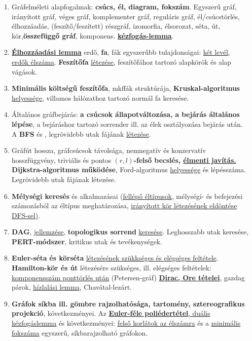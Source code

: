 \documentclass[10pt]{article}
\begin{document}
        \begin{enumerate}
            \item Gráfelméleti alapfogalmak: \textbf{csúcs, él, diagram, fokszám}. Egyszerű gráf, irányított gráf, véges gráf, komplementer gráf, reguláris gráf, él/csúcstörlés, élhozzáadás, (feszítő/feszített) részgráf, izomorfia, élsorozat, séta, út, kör,\textbf{összefüggő gráf}, komponens. \underline{\textbf{kézfogás-lemma}}.
            \item \underline{\textbf{Élhozzáadási lemma}} erdő, \textbf{fa}, fák egyszerűbb tulajdonságai: \underline{két levél}, \underline{erdők élszáma}. \textbf{Feszítőfa} \underline{létezése}, feszítőfához tartozó alapkörök és alap vágások.
            \item \textbf{Minimális költségű feszítőfa}, mkffák struktúrája, \textbf{Kruskal-algoritmus} \underline{helyessége}, villamos hálózathoz tartozó normál fa keresése.
            \item Általános gráfbejárás: \textbf{a csúcsok állapotváltozása, a bejárás általános lépése}, a bejáráshoz tartozó sorrender ill. az élek osztályozása bejárás után. A \textbf{BFS} és , legrövidebb utak fájának \underline{létezése}.
            \item Gráfút hossza, gráfcsúcsok távolsága, nemnegatív és konzervatív hosszfüggvény, triviális és pontos $(r,l)$\textbf{-felső becslés, \underline{élmenti javítás.} Dijkstra-algoritmus működése}, Ford-algoritmus \underline{helyessége} és lépésszáma. Legrövidebb utak fájának létezése.
            \item \textbf{Mélységi keresés} és alkalmazásai (\underline{fellépő éltípusok}, mélységi- és befejezési számozásból az éltípus meghatározása, \underline{irányított kör létezésének eldöntése DFS-sel)}.
            \item \textbf{DAG}, \underline{jellemzése}, \textbf{topologikus sorrend} \underline{keresése}. Leghosszabb utak keresése, \textbf{PERT-módszer}, kritikus utak és tevékenységek.
            \item \textbf{Euler-séta és körséta} \underline{létezésének szükkséges és elégséges feltétele}. \textbf{Hamilton-kör és út} létezésére szükséges, ill. elégséges feltételek: \underline{komponensszám ponttörlés után} (Petersen-gráf) \underline{\textbf{Dirac, Ore tételei}}, gazdag párok, \underline{hízlalási lemma}, Chavátal-lezárt.
            \item \textbf{Gráfok síkba ill. gömbre rajzolhatósága, tartomény, sztereografikus projekció}, következményei. Az \underline{\textbf{Euler-féle poliédertétel}, duális kézfogáslemma} és következményei: \underline{felső korlátok az élszámra} és a \underline{minimális fokszáma} egyszerű, síkbarajzolható gráfokon.

\end{enumerate}
\end{document}
